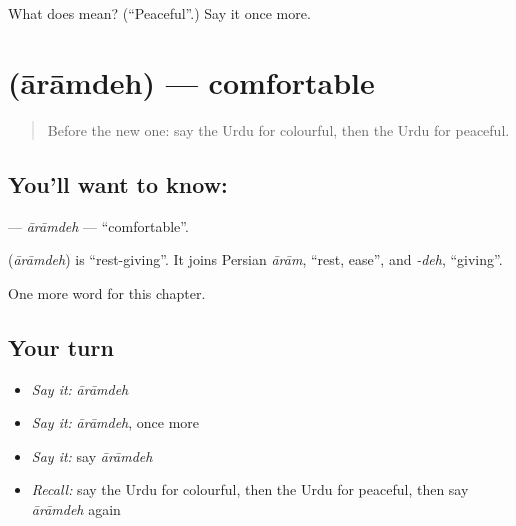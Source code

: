 \begin{tcolorbox}[breakable,colback=teal!4,colframe=teal!35!black,title={Before you move on}]
What does  mean? (\textquotedblleft{}Peaceful\textquotedblright{}.) Say it once more.
\end{tcolorbox}
\section[\texorpdfstring{\ur{آرام} \ur{دہ} (ārāmdeh)}{آرام دہ (ārāmdeh)}]{  (ārāmdeh) — comfortable}

\label{lesson:UR-C249-aramdeh}



\begin{quote}
Before the new one: say the Urdu for colourful, then the Urdu for peaceful.
\end{quote}

\subsection*{You'll want to know:  }
\textbf{ } — \emph{ārāmdeh} — \textquotedblleft{}comfortable\textquotedblright{}.

\begin{cousinweb}
\textbf{ } (\emph{ārāmdeh}) is \textquotedblleft{}rest-giving\textquotedblright{}. It joins Persian \emph{ārām}, \textquotedblleft{}rest, ease\textquotedblright{}, and \emph{-deh}, \textquotedblleft{}giving\textquotedblright{}.
\end{cousinweb}

\begin{grammarlens}[title={What you've built}]
One more word for this chapter.
\end{grammarlens}

\subsection*{Your turn}
\begin{itemize}
\raggedright
  \item \emph{Say it:} \emph{ārāmdeh}
  \item \emph{Say it:} \emph{ārāmdeh}, once more
  \item \emph{Say it:} say \emph{ārāmdeh}
  \item \emph{Recall:} say the Urdu for colourful, then the Urdu for peaceful, then say \emph{ārāmdeh} again
\end{itemize}

